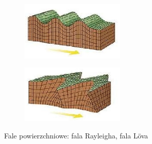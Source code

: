\begin{figure}[h]
        \centering
        \begin{subfigure}{0.35\textwidth}
                \centering
	     \includegraphics[width=5cm]{Zdjecia/2/fala_rayleigha}
                \subcaption{\label{subfigure_a}}
        \end{subfigure}
        \begin{subfigure}{0.35\textwidth}
                \centering
	     \includegraphics[width=5cm]{Zdjecia/2/fala_lova}
                \subcaption{\label{subfigure_b}}
        \end{subfigure}
        \label{fig:subcaption_example}
        \caption{Fale powierzchniowe: \protect{} fala Rayleigha, \protect{} fala L\"{o}va}
\end{figure}





















